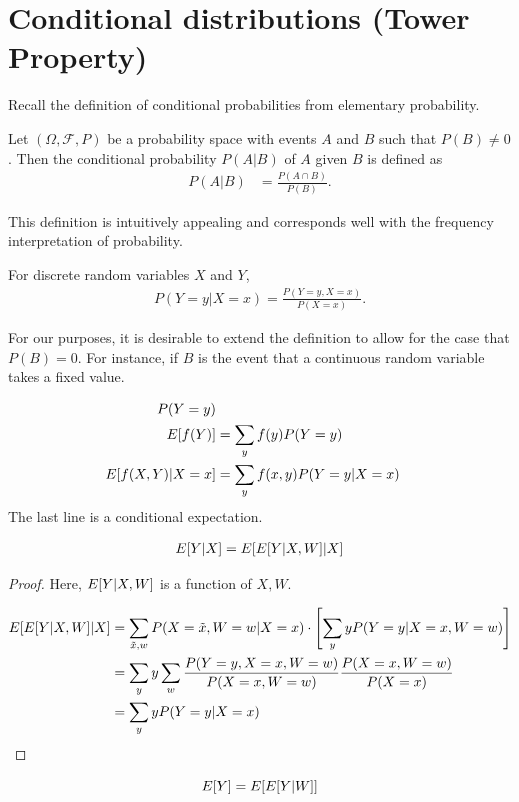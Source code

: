 \documentclass[twoside]{article}
\begin{document}
\section{Conditional distributions (Tower Property)}

Recall the definition of conditional probabilities from elementary probability.

\begin{definition}
  Let $(\Omega, \mathcal F, P)$ be a probability space with events $A$ and $B$
  such that $P(B) \neq 0$.  Then the conditional probability $P(A|B)$ of $A$
  given $B$ is defined as 
  \begin{align*}
    P(A | B) &= \frac{P(A \cap B)}{P(B)}. 
  \end{align*}
\end{definition}

This definition is intuitively appealing and corresponds well with the
frequency interpretation of probability.

\begin{example}
  For discrete random variables $X$ and $Y$,
  \begin{align*}
    P(Y = y | X = x) = \frac{P(Y = y, X = x)}{P(X = x)}.
  \end{align*}
\end{example}

For our purposes, it is desirable to extend the definition to allow for
the case that $P(B) = 0$.  For instance, if $B$ is the event that a
continuous random variable takes a fixed value.  

\begin{align*}
  P(Y = y) \\
  E[f(Y)] &= \sum_y f(y) P(Y = y) \\
  E[f(X, Y) | X = x] &= \sum_y f(x, y) P(Y = y | X = x)
\end{align*}
The last line is a conditional expectation.

\begin{theorem}
\begin{align*}
  E[Y | X] = E[E[Y | X, W] | X]
\end{align*}
\end{theorem}
\begin{proof}
  Here, $E[Y | X, W]$ is a function of $X, W$. 

  \begin{align*}
    E[E[Y | X, W] | X] &= \sum_{\tilde{x}, w} P(X = \tilde{x}, W = w | X = x)
    \cdot \left[ \sum_y yP(Y = y | X = x, W = w)\right] \\
    &= \sum_y y \sum_w \frac{P(Y = y, X = x, W = w)}{P(X = x, W = w)}  \frac{P(X =
    x, W = w)}{P(X = x)} \\
    &= \sum_y y P(Y = y | X = x)
  \end{align*}
\end{proof}
\begin{corollary}
  \[E[Y] = E[E[Y | W]]\]
\end{corollary}
\end{document}
